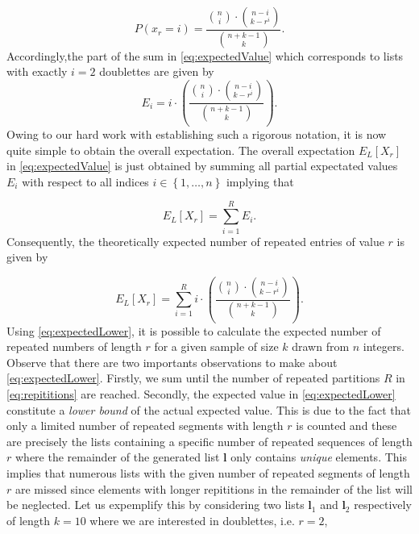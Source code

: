 \documentclass{article}
\begin{document}
$$P(x_r=i)=\dfrac{{n\choose i}\cdot{n-i\choose k-r^i}}{{n+k-1\choose k}}.$$
Accordingly,the part of the sum in \eqref{eq:expectedValue} which corresponds to lists with exactly $i=2$ doublettes are given by
$$E_i=i\cdot\left(\dfrac{{n\choose i}\cdot{n-i\choose k-r^i}}{{n+k-1\choose k}}\right).$$
Owing to our hard work with establishing such a rigorous notation, it is now quite simple to obtain the overall expectation. The overall expectation $E_L[X_r]$ in \eqref{eq:expectedValue} is just obtained by summing all partial expectated values $E_i$ with respect to all indices $i\in\left\{1,\ldots,n\right\}$ implying that

$$E_L[X_r]=\sum_{i=1}^R E_i.$$
Consequently, the theoretically expected number of repeated entries of value $r$ is given by

\begin{equation}
  E_L[X_r]=\displaystyle\sum_{i=1}^R i\cdot\left(\dfrac{{n\choose i}\cdot{n-i\choose k-r^i}}{{n+k-1\choose k}}\right).
  \label{eq:expectedLower}
  \end{equation}
Using \eqref{eq:expectedLower}, it is possible to calculate the expected number of repeated numbers of length $r$ for a given sample of size $k$ drawn from $n$ integers. Observe that there are two importants observations to make about \eqref{eq:expectedLower}. Firstly, we sum until the number of repeated partitions $R$ in \eqref{eq:repititions} are reached. Secondly, the expected value in \eqref{eq:expectedLower} constitute a \textit{lower bound} of the actual expected value. This is due to the fact that only a limited number of repeated segments with length $r$ is counted and these are precisely the lists containing a specific number of repeated sequences of length $r$ where the remainder of the generated list $\mathbf{l}$ only contains \textit{unique} elements. This implies that numerous lists with the given number of repeated segments of length $r$ are missed since elements with longer repititions in the remainder of the list will be neglected. Let us expemplify this by considering two lists $\mathbf{l}_1$ and $\mathbf{l}_2$ respectively of length $k=10$ where we are interested in doublettes, i.e. $r=2$,
\end{document}
